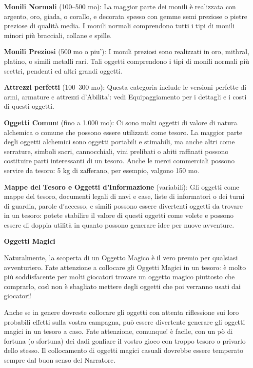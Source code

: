 \documentclass[a4paper,11pt,twoside,openany]{book}
\begin{document}
\textbf{Monili Normali} (100--500 mo): La maggior parte dei monili è realizzata con argento, oro, giada, o corallo, e decorata spesso con gemme semi preziose o pietre preziose di qualità media. I monili normali comprendono tutti i tipi di monili minori più bracciali, collane e spille.

\textbf{Monili Preziosi} (500 mo o piu'): I monili preziosi sono realizzati in oro, mithral, platino, o simili metalli rari. Tali oggetti comprendono i tipi di monili normali più scettri, pendenti ed altri grandi oggetti.

\textbf{Attrezzi perfetti} (100--300 mo): Questa categoria include le versioni perfette di armi, armature e attrezzi d'Abilita': vedi Equipaggiamento per i dettagli e i costi di questi oggetti.

\textbf{Oggetti Comun}i (fino a 1.000 mo): Ci sono molti oggetti di valore di natura alchemica o comune che possono essere utilizzati come tesoro. La maggior parte degli oggetti alchemici sono oggetti portabili e stimabili, ma anche altri come serrature, simboli sacri, cannocchiali, vini prelibati o abiti raffinati possono costituire parti interessanti di un tesoro. Anche le merci commerciali possono servire da tesoro: 5 kg di zafferano, per esempio, valgono 150 mo.

\textbf{Mappe del Tesoro e Oggetti d'Informazione} (variabili): Gli oggetti come mappe del tesoro, documenti legali di navi e case, liste di informatori o dei turni di guardia, parole d'accesso, e simili possono essere divertenti oggetti da trovare in un tesoro: potete stabilire il valore di questi oggetti come volete e possono essere di doppia utilità in quanto possono generare idee per nuove avventure.

\textbf{Oggetti Magici}

Naturalmente, la scoperta di un Oggetto Magico è il vero premio per qualsiasi avventuriero. Fate attenzione a collocare gli Oggetti Magici in un tesoro: è molto più soddisfacente per molti giocatori trovare un oggetto magico piuttosto che comprarlo, così non è sbagliato mettere degli oggetti che poi verranno usati dai giocatori!

Anche se in genere dovreste collocare gli oggetti con attenta riflessione sui loro probabili effetti sulla vostra campagna, può essere divertente generare gli oggetti magici in un tesoro a caso. Fate attenzione, comunque! è facile, con un pò di fortuna (o sfortuna) dei dadi gonfiare il vostro gioco con troppo tesoro o privarlo dello stesso. Il collocamento di oggetti magici casuali dovrebbe essere temperato sempre dal buon senso del Narratore.
\end{document}
